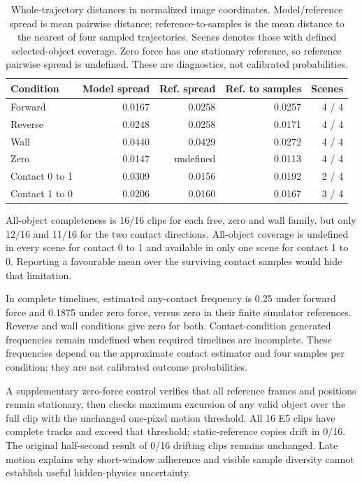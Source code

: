 \documentclass[11pt,a4paper]{article}
\begin{document}
\begin{table}[!ht]
\centering
\begin{tabular}{lrrrr}
\hline
Condition & Model spread & Ref. spread & Ref. to samples & Scenes \\
\hline
Forward & 0.0167 & 0.0258 & 0.0257 & 4 / 4 \\
Reverse & 0.0248 & 0.0258 & 0.0171 & 4 / 4 \\
Wall & 0.0440 & 0.0429 & 0.0272 & 4 / 4 \\
Zero & 0.0147 & undefined & 0.0113 & 4 / 4 \\
Contact 0 to 1 & 0.0309 & 0.0156 & 0.0192 & 2 / 4 \\
Contact 1 to 0 & 0.0206 & 0.0160 & 0.0167 & 3 / 4 \\
\hline
\end{tabular}
\caption{Whole-trajectory distances in normalized image coordinates. Model/reference spread is mean pairwise distance; reference-to-samples is the mean distance to the nearest of four sampled trajectories. Scenes denotes those with defined selected-object coverage. Zero force has one stationary reference, so reference pairwise spread is undefined. These are diagnostics, not calibrated probabilities.}
\label{tab:uncertainty}
\end{table}

All-object completeness is 16/16 clips for each free, zero and wall family, but only 12/16 and 11/16 for the two contact directions. All-object coverage is undefined in every scene for contact 0 to 1 and available in only one scene for contact 1 to 0. Reporting a favourable mean over the surviving contact samples would hide that limitation.

In complete timelines, estimated any-contact frequency is 0.25 under forward force and 0.1875 under zero force, versus zero in their finite simulator references. Reverse and wall conditions give zero for both. Contact-condition generated frequencies remain undefined when required timelines are incomplete. These frequencies depend on the approximate contact estimator and four samples per condition; they are not calibrated outcome probabilities.

A supplementary zero-force control verifies that all reference frames and positions remain stationary, then checks maximum excursion of any valid object over the full clip with the unchanged one-pixel motion threshold. All 16 E5 clips have complete tracks and exceed that threshold; static-reference copies drift in 0/16. The original half-second result of 0/16 drifting clips remains unchanged. Late motion explains why short-window adherence and visible sample diversity cannot establish useful hidden-physics uncertainty.
\end{document}
